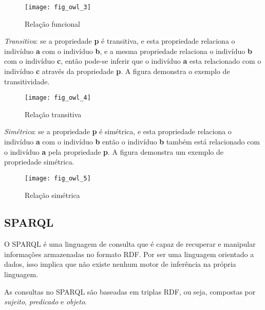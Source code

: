 \begin{itemize}
    \begin{figure}[!h]
      \centering
      \texttt{[image: fig\_owl\_3]} 
      \caption{Relação funcional}
      \label{fig:fig_owl_3} 
    \end{figure}

    \vskip 0.6cm
    
    \textit{Transitiva}: se a propriedade \textbf{p} é transitiva, e esta 
    propriedade relaciona o indivíduo \textbf{a} com o indivíduo \textbf{b}, e a
    mesma propriedade relaciona o indivíduo \textbf{b} com o indivíduo \textbf{c},
    então pode-se inferir que o indivíduo \textbf{a} esta relacionado com o 
    indivíduo \textbf{c} através da propriedade \textbf{p}. A figura demonstra 
    o exemplo de transitividade.
    
    \begin{figure}[!h]
      \centering
      \texttt{[image: fig\_owl\_4]} 
      \caption{Relação transitiva}
      \label{fig:fig_owl_4} 
    \end{figure}
    
    \vskip 0.6cm
    
    \textit{Simétrica}: se a propriedade \textbf{p} é simétrica, e esta 
    propriedade relaciona o indivíduo \textbf{a} com o indivíduo \textbf{b} então 
    o indivíduo \textbf{b} também está relacionado com o indivíduo \textbf{a} pela
    propriedade \textbf{p}. A figura demonstra um exemplo de propriedade simétrica.
    
    \begin{figure}[!h]
      \centering
      \texttt{[image: fig\_owl\_5]} 
      \caption{Relação simétrica}
      \label{fig:fig_owl_5} 
    \end{figure}
    
    \vskip 0.6cm
\end{itemize}

\subsection{SPARQL}
\label{sec:sparql}

O SPARQL é uma linguagem de consulta que é capaz de recuperar e manipular 
informações armazenadas no formato RDF. Por ser uma linguagem orientado a dados, 
isso implica que não existe nenhum motor de inferência na própria linguagem.

As consultas no SPARQL são baseadas em triplas RDF, ou seja, compostas por 
\textit{sujeito}, \textit{predicado} e \textit{objeto}.

